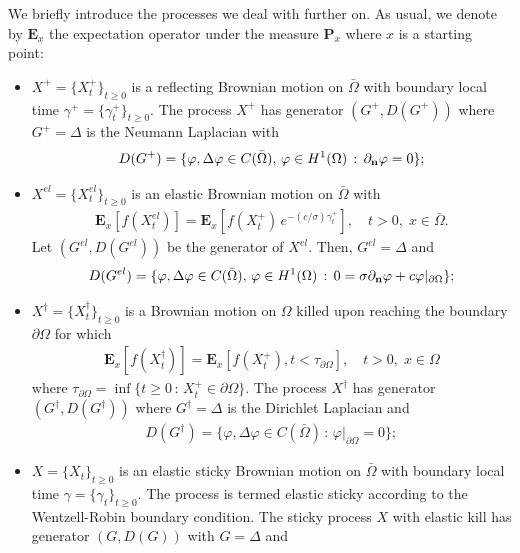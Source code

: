 \documentclass[11pt,a4paper]{article}
\begin{document}
We briefly introduce the processes we deal with further on. As usual, we denote by $\mathbf{E}_x$ the expectation operator under the measure $\mathbf{P}_x$ where $x$ is a starting point:
\begin{itemize}
\item[i)] $X^+= \{X^+_t\}_{t\geq 0}$ is a reflecting Brownian motion on $\bar{\Omega}$ with boundary local time $\gamma^+ = \{\gamma^+_t\}_{t\geq 0}$. The process $X^+$ has generator $(G^+, D(G^+))$ where $G^+=\Delta$ is the Neumann Laplacian with 
\begin{align*}
D(G^+)= \{\varphi, \Delta \varphi \in C(\bar{\Omega}),\, \varphi \in H^1(\Omega)\,:\, \partial_{\bf n} \varphi = 0\};
\end{align*}
\item[ii)] $X^{el}=\{X^{el}_t\}_{t\geq 0}$ is an elastic Brownian motion on $\bar{\Omega}$ with
\begin{align*}
\mathbf{E}_x[f(X^{el}_t)] = \mathbf{E}_x[f(X^+_t)\, e^{-(c/\sigma) \gamma^+_t}], \quad t>0,\; x \in \bar{\Omega}.
\end{align*}
Let $(G^{el}, D(G^{el}))$ be the generator of $X^{el}$. Then, $G^{el}=\Delta$ and
\begin{align*}
D(G^{el}) = \{\varphi, \Delta \varphi \in C(\bar{\Omega}), \, \varphi \in H^1(\Omega)\,:\, 0 = \sigma \partial_{\bf n} \varphi  + c \varphi |_{\partial \Omega}\};
\end{align*}
\item[iii)] $X^\dagger = \{X^\dagger_t\}_{t\geq 0}$ is a Brownian motion on $\Omega$ killed upon reaching the boundary $\partial \Omega$ for which
\begin{align*}
\mathbf{E}_x[f(X^\dagger_t)] = \mathbf{E}_x[f(X^+_t), t< \tau_{\partial \Omega}], \quad t>0,\; x \in \Omega
\end{align*}
where $\tau_{\partial \Omega} = \inf \{t \geq 0\,:\, X^+_t \in \partial \Omega\}$. The process $X^\dagger$ has generator $(G^\dagger, D(G^\dagger))$ where $G^\dagger=\Delta$ is the Dirichlet Laplacian and
\begin{align*}
D(G^\dagger) = \{ \varphi, \Delta \varphi \in C(\bar{\Omega})\,:\, \varphi |_{\partial \Omega} = 0\};
\end{align*}
\item[iv)] $X = \{X_t\}_{t\geq 0}$ is an elastic sticky Brownian motion on $\bar{\Omega}$ with boundary local time $\gamma=\{\gamma_t\}_{t \geq 0}$. The process is termed elastic sticky according to the Wentzell-Robin boundary condition.  
The sticky process $X$ with elastic kill has generator $(G, D(G))$ with $G=\Delta$ and

\end{itemize}
\end{document}
